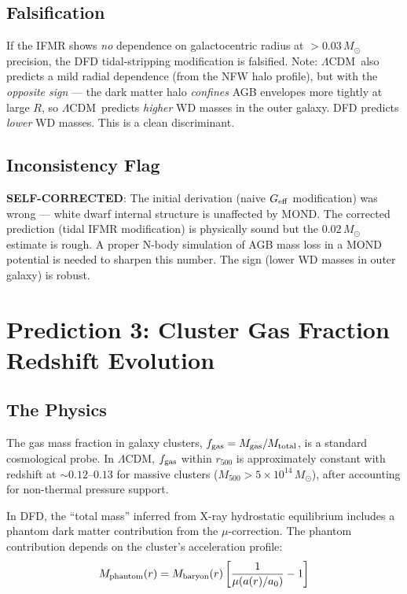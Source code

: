 \documentclass[11pt]{article}
\newcommand{\LCDM}{$\Lambda$CDM}
\begin{document}
\subsection{Falsification}

If the IFMR shows \emph{no} dependence on galactocentric radius at
$> 0.03\,M_\odot$ precision, the DFD tidal-stripping modification is
falsified. Note: \LCDM\ also predicts a mild radial dependence (from
the NFW halo profile), but with the \emph{opposite sign} --- the dark
matter halo \emph{confines} AGB envelopes more tightly at large $R$,
so \LCDM\ predicts \emph{higher} WD masses in the outer galaxy. DFD
predicts \emph{lower} WD masses. This is a clean discriminant.

\subsection{Inconsistency Flag}

\textbf{SELF-CORRECTED}: The initial derivation (naive $G_{\rm eff}$
modification) was wrong --- white dwarf internal structure is unaffected
by MOND. The corrected prediction (tidal IFMR modification) is physically
sound but the $0.02\,M_\odot$ estimate is rough. A proper N-body
simulation of AGB mass loss in a MOND potential is needed to sharpen
this number. The sign (lower WD masses in outer galaxy) is robust.

\section{Prediction 3: Cluster Gas Fraction Redshift Evolution}
\label{sec:fgas}

\subsection{The Physics}

The gas mass fraction in galaxy clusters, $f_{\rm gas} = M_{\rm gas}/M_{\rm total}$,
is a standard cosmological probe. In \LCDM, $f_{\rm gas}$ within $r_{500}$
is approximately constant with redshift at $\sim 0.12$--$0.13$ for massive
clusters ($M_{500} > 5 \times 10^{14}\,M_\odot$), after accounting for
non-thermal pressure support.

In DFD, the ``total mass'' inferred from X-ray hydrostatic equilibrium includes
a phantom dark matter contribution from the $\mu$-correction. The phantom
contribution depends on the cluster's acceleration profile:
\begin{equation}
M_{\rm phantom}(r) = M_{\rm baryon}(r)\left[\frac{1}{\mu(a(r)/a_0)} - 1\right]
\end{equation}
\end{document}
